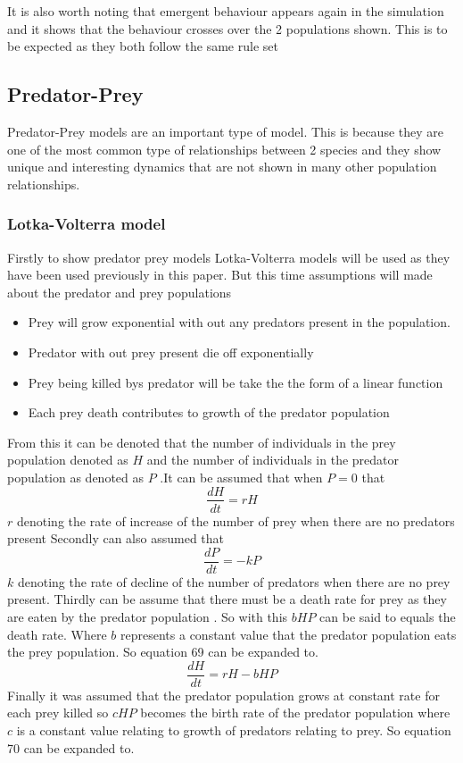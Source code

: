 \documentclass[final]{cmpreport}
\begin{document}
		It is also worth noting that emergent behaviour appears again in the simulation and it shows that the behaviour crosses over the 2 populations shown. This is to be expected as they both follow the same rule set 
		
		
		
	\subsection{Predator-Prey}
	Predator-Prey models are an important type of model. This is because they are one of the most common type of relationships between 2 species and they show unique and interesting dynamics that are not shown in many other population relationships. 
	
	\subsubsection{Lotka-Volterra model}
	Firstly to show predator prey models Lotka-Volterra models will be used as they have been used previously in this paper. But this time assumptions will made about the predator and prey populations

	\begin{itemize}
		\item Prey will grow exponential with out any predators present in the population.
		\item Predator with out prey present die off exponentially
		\item Prey being killed bys predator will be take the the form of a linear function
		\item Each prey death contributes to growth of the predator population 
	\end{itemize}
	
	From this it can be denoted that the number of individuals in the prey population denoted as $H$ and the number of individuals in the predator population as denoted as $P$ .It can be assumed that when $P=0$ that
	\begin{equation} 
	\frac{dH}{dt}=rH
	\end{equation}
	$r$ denoting the rate of increase of the number of prey when there are no predators present
	Secondly can also assumed that 
	\begin{equation} 
	 \frac{dP}{dt}=-kP 
	\end{equation}
	$k$ denoting the rate of decline of the number of predators when there are no prey present. 
	Thirdly can be assume that there must be a death rate for prey as they are eaten by the predator population . So with this $bHP$ can be said to equals the death rate.  Where $b$ represents a constant value that the predator population eats the prey population. So equation 69 can be expanded to.
	\begin{equation} 
	 \frac{dH}{dt}=rH-bHP
	\end{equation}
	Finally it was assumed that the predator population grows at constant rate for each prey killed so $cHP$ becomes the birth rate of the predator population where $c$ is a constant value relating to growth of predators relating to prey. So equation 70 can be expanded to.
	
\end{document}
